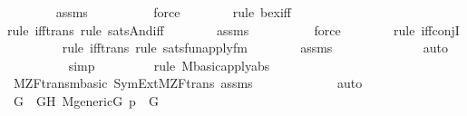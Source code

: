 \begin{isabellebody}
\ \ \ \ \ \ \isamarkupfalse%
\ assms{}\isanewline
\ \ \ \ \ \ \ \ \isamarkupfalse%
\ force\isanewline
\ \ \ \ \ \ \ \isamarkupfalse%
{\isacharparenleft}{\kern0pt}rule\ bex{\isacharunderscore}{\kern0pt}iff{\isacharparenright}{\kern0pt}\isanewline
\ \ \ \ \ \ \ \isamarkupfalse%
{\isacharparenleft}{\kern0pt}rule\ iff{\isacharunderscore}{\kern0pt}trans{\isacharcomma}{\kern0pt}\ rule\ sats{\isacharunderscore}{\kern0pt}And{\isacharunderscore}{\kern0pt}iff{\isacharparenright}{\kern0pt}\isanewline
\ \ \ \ \ \ \isamarkupfalse%
\ assms{}\isanewline
\ \ \ \ \ \ \ \ \isamarkupfalse%
\ force\isanewline
\ \ \ \ \ \ \ \isamarkupfalse%
{\isacharparenleft}{\kern0pt}rule\ iff{\isacharunderscore}{\kern0pt}conjI{\isacharparenright}{\kern0pt}\isanewline
\ \ \ \ \ \ \ \ \isamarkupfalse%
{\isacharparenleft}{\kern0pt}rule\ iff{\isacharunderscore}{\kern0pt}trans{\isacharcomma}{\kern0pt}\ rule\ sats{\isacharunderscore}{\kern0pt}fun{\isacharunderscore}{\kern0pt}apply{\isacharunderscore}{\kern0pt}fm{\isacharparenright}{\kern0pt}\isanewline
\ \ \ \ \ \ \isamarkupfalse%
\ assms{}\isanewline
\ \ \ \ \ \ \ \ \ \ \ \ \isamarkupfalse%
\ auto{\isacharbrackleft}{\kern0pt}{}{\isacharbrackright}{\kern0pt}\isanewline
\ \ \ \ \ \ \ \ \isamarkupfalse%
\ simp\isanewline
\ \ \ \ \ \ \ \ \isamarkupfalse%
{\isacharparenleft}{\kern0pt}rule\ M{\isacharunderscore}{\kern0pt}basic{\isachardot}{\kern0pt}apply{\isacharunderscore}{\kern0pt}abs{\isacharparenright}{\kern0pt}\isanewline
\ \ \ \ \ \ \isamarkupfalse%
\ M{\isacharunderscore}{\kern0pt}ZF{\isacharunderscore}{\kern0pt}trans{\isachardot}{\kern0pt}mbasic\ SymExt{\isacharunderscore}{\kern0pt}M{\isacharunderscore}{\kern0pt}ZF{\isacharunderscore}{\kern0pt}trans\ assms{}\isanewline
\ \ \ \ \ \ \ \ \ \ \ \isamarkupfalse%
\ auto{\isacharbrackleft}{\kern0pt}{}{\isacharbrackright}{\kern0pt}\isanewline
\ \ \ \ \ \ \isamarkupfalse%
\isanewline
\ \ \isamarkupfalse%
\isanewline
\isanewline
\ \ \isamarkupfalse%
\ G\ \ GH{\isacharcolon}{\kern0pt}\ {\isachardoublequoteopen}M{\isacharunderscore}{\kern0pt}generic{\isacharparenleft}{\kern0pt}G{\isacharparenright}{\kern0pt}{\isachardoublequoteclose}\ {\isachardoublequoteopen}p{}\ {\isasymin}\ G{\isachardoublequoteclose}\ \isanewline

\end{isabellebody}
